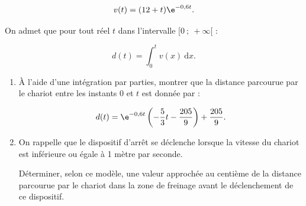\[v(t) = (12 + t)\e^{-0,6t}.\]

On admet que pour tout réel $t$ dans l'intervalle $[0~;~ +\infty[$ :

\[d(t) = \displaystyle\int_0^t v(x)\:\text{d}x.\]

\smallskip

\begin{enumerate}
\item À l'aide d'une intégration par parties, montrer que la distance parcourue par le
chariot entre les instants 0 et $t$ est donnée par : 

\[d(t)= \e^{-0,6t} \left(- \dfrac53 t - \dfrac{205}{9}\right) + \dfrac{205}{9}.\]

\item On rappelle que le dispositif d'arrêt se déclenche lorsque la vitesse du chariot est inférieure ou égale à 1 mètre par seconde.

Déterminer, selon ce modèle, une valeur approchée au centième de la distance parcourue par le chariot dans la zone de freinage avant le déclenchement de ce dispositif.
\end{enumerate}
